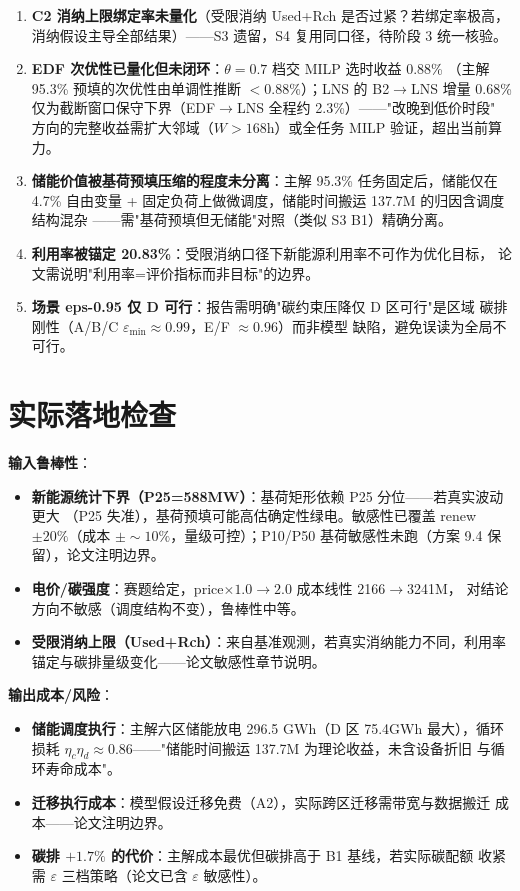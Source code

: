 \documentclass{internal-report}
\begin{document}
\begin{enumerate}
  \item \textbf{C2 消纳上限绑定率未量化}（受限消纳 Used+Rch 是否过紧？若绑定率极高，
        消纳假设主导全部结果）——S3 遗留，S4 复用同口径，待阶段 3 统一核验。
  \item \textbf{EDF 次优性已量化但未闭环}：$\theta{=}0.7$ 档交 MILP 选时收益 0.88\%
        （主解 95.3\% 预填的次优性由单调性推断 $<0.88\%$）；LNS 的 B2$\to$LNS 增量
        0.68\% 仅为截断窗口保守下界（EDF$\to$LNS 全程约 2.3\%）——"改晚到低价时段"
        方向的完整收益需扩大邻域（$W>168$h）或全任务 MILP 验证，超出当前算力。
  \item \textbf{储能价值被基荷预填压缩的程度未分离}：主解 95.3\% 任务固定后，储能仅在
        4.7\% 自由变量 + 固定负荷上做微调度，储能时间搬运 137.7M 的归因含调度结构混杂
        ——需"基荷预填但无储能"对照（类似 S3 B1）精确分离。
  \item \textbf{利用率被锚定 20.83\%}：受限消纳口径下新能源利用率不可作为优化目标，
        论文需说明"利用率=评价指标而非目标"的边界。
  \item \textbf{场景 eps-0.95 仅 D 可行}：报告需明确"碳约束压降仅 D 区可行"是区域
        碳排刚性（A/B/C $\varepsilon_{\min}\approx0.99$，E/F $\approx0.96$）而非模型
        缺陷，避免误读为全局不可行。
\end{enumerate}

\section{实际落地检查}

\textbf{输入鲁棒性}：
\begin{itemize}
  \item \textbf{新能源统计下界（P25=588MW）}：基荷矩形依赖 P25 分位——若真实波动更大
        （P25 失准），基荷预填可能高估确定性绿电。敏感性已覆盖 renew$\pm20\%$（成本
        $\pm\sim10\%$，量级可控）；P10/P50 基荷敏感性未跑（方案 9.4 保留），论文注明边界。
  \item \textbf{电价/碳强度}：赛题给定，price$\times1.0\to2.0$ 成本线性 2166$\to$3241M，
        对结论方向不敏感（调度结构不变），鲁棒性中等。
  \item \textbf{受限消纳上限（Used+Rch）}：来自基准观测，若真实消纳能力不同，利用率
        锚定与碳排量级变化——论文敏感性章节说明。
\end{itemize}

\textbf{输出成本/风险}：
\begin{itemize}
  \item \textbf{储能调度执行}：主解六区储能放电 296.5 GWh（D 区 75.4GWh 最大），循环
        损耗 $\eta_c\eta_d\approx0.86$——"储能时间搬运 137.7M 为理论收益，未含设备折旧
        与循环寿命成本"。
  \item \textbf{迁移执行成本}：模型假设迁移免费（A2），实际跨区迁移需带宽与数据搬迁
        成本——论文注明边界。
  \item \textbf{碳排 $+1.7\%$ 的代价}：主解成本最优但碳排高于 B1 基线，若实际碳配额
        收紧需 $\varepsilon$ 三档策略（论文已含 $\varepsilon$ 敏感性）。
\end{itemize}
\end{document}
